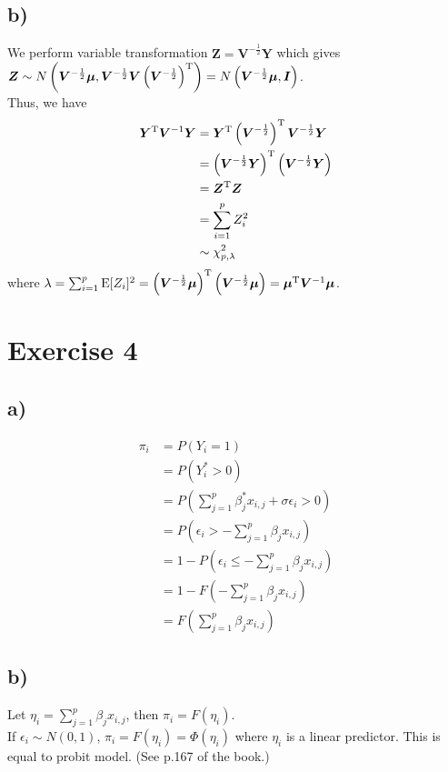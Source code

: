 \documentclass[a4paper]{article}
\newcommand{\E}{\mathrm{E}}
\begin{document}
\subsection{b)}
We perform variable transformation $\bm{Z} = \bm{V}^{-\frac{1}{2}}\bm{Y}$ which gives $\bm{Z} \sim N\left(\bm{V}^{-\frac{1}{2}}\bm{\mu}, \bm{V}^{-\frac{1}{2}}\bm{V}\left(\bm{V}^{-\frac{1}{2}}\right)^{\rm T} \right) = N\left(\bm{V}^{-\frac{1}{2}}\bm{\mu}, \bm{I}\right)$.\\

Thus, we have
\begin{align*}
\bm{Y}^{\rm T}\bm{V}^{-1}\bm{Y}
&= \bm{Y}^{\rm T} \left(\bm{V}^{-\frac{1}{2}}\right)^{\rm T}\bm{V}^{-\frac{1}{2}}\bm{Y}\\
&= \left(\bm{V}^{-\frac{1}{2}}\bm{Y}\right)^{\rm T}\left(\bm{V}^{-\frac{1}{2}}\bm{Y} \right)\\
&= \bm{Z}^{\rm T}\bm{Z}\\
&= \sum_{i=1}^{p} Z_{i}^2\\
&\sim \chi_{p,\lambda}^2
\end{align*}
where $\lambda = \sum_{i=1}^{p} \E[Z_{i}]^2 = \left(\bm{V}^{-\frac{1}{2}}\bm{\mu}\right)^{\rm T}\left(\bm{V}^{-\frac{1}{2}}\bm{\mu} \right) = \bm{\mu}^{\rm T}\bm{V}^{-1}\bm{\mu}$.


\vspace{\baselineskip}
\section{Exercise 4}
\subsection{a)}
\begin{align*}
\pi_{i} &= P\left(Y_{i} = 1\right)\\
&= P\left(Y_{i}^{*} > 0\right)\\
&= P\left(\sum_{j=1}^{p} \beta_{j}^{*} x_{i,j} + \sigma \epsilon_{i} > 0\right)\\
&= P\left(\epsilon_{i} > -\sum_{j=1}^{p} \beta_{j} x_{i,j}\right)\\
&= 1 - P\left(\epsilon_{i} \leq -\sum_{j=1}^{p} \beta_{j} x_{i,j}\right)\\
&= 1 - F\left(-\sum_{j=1}^{p} \beta_{j} x_{i,j}\right)\\
&= F\left(\sum_{j=1}^{p} \beta_{j} x_{i,j}\right)
\end{align*}


\subsection{b)}
Let $\eta_{i} = \sum_{j=1}^{p}\beta_{j} x_{i,j}$, then $\pi_{i} = F\left(\eta_{i}\right)$.\\
If $\epsilon_{i} \sim N(0,1)$, $\pi_{i} = F\left(\eta_{i}\right) = \Phi\left(\eta_{i}\right)$ where $\eta_{i}$ is a linear predictor. This is equal to probit model. (See p.167 of the book.)
\end{document}
